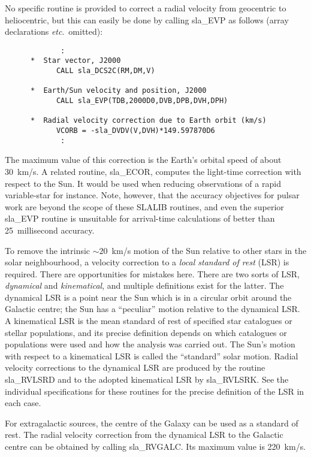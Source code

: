 \documentclass[11pt,twoside]{article}
\begin{document}
No specific routine is provided to correct a radial velocity
from geocentric to heliocentric, but this can easily be done by calling
sla\_EVP
as follows (array declarations {\it etc}.\ omitted):
\goodbreak
\begin{verbatim}
             :
      *  Star vector, J2000
            CALL sla_DCS2C(RM,DM,V)

      *  Earth/Sun velocity and position, J2000
            CALL sla_EVP(TDB,2000D0,DVB,DPB,DVH,DPH)

      *  Radial velocity correction due to Earth orbit (km/s)
            VCORB = -sla_DVDV(V,DVH)*149.597870D6
             :
\end{verbatim}
\goodbreak
The maximum value of this correction is the Earth's orbital speed
of about 30~km/s.  A related routine,
sla\_ECOR,
computes the light-time correction with respect to the Sun.  It
would be used when reducing observations of a rapid variable-star
for instance.
Note, however, that the accuracy objectives for pulsar work are
beyond the scope of these SLALIB routines, and even the superior
sla\_EVP
routine is unsuitable for arrival-time calculations of better
than 25~millisecond accuracy.

To remove the intrinsic $\sim20$~km/s motion of the Sun relative
to other stars in the solar neighbourhood,
a velocity correction to a
{\it local standard of rest}\/ (LSR) is required.  There are
opportunities for mistakes here.  There are two sorts of LSR,
{\it dynamical}\/ and {\it kinematical}, and
multiple definitions exist for the latter.  The
dynamical LSR is a point near the Sun which is in a circular
orbit around the Galactic centre;  the Sun has a ``peculiar''
motion relative to the dynamical LSR.  A kinematical LSR is
the mean standard of rest of specified star catalogues or stellar
populations, and its precise definition depends on which
catalogues or populations were used and how the analysis was
carried out.  The Sun's motion with respect to a kinematical
LSR is called the ``standard'' solar motion.  Radial
velocity corrections to the dynamical LSR are produced by the routine
sla\_RVLSRD
and to the adopted kinematical LSR by
sla\_RVLSRK.
See the individual specifications for these routines for the
precise definition of the LSR in each case.

For extragalactic sources, the centre of the Galaxy can be used as
a standard of rest.  The radial velocity correction from the
dynamical LSR to the Galactic centre can be obtained by calling
sla\_RVGALC.
Its maximum value is 220~km/s.
\end{document}
